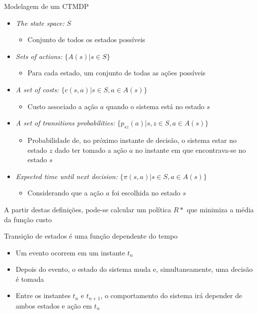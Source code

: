 \begin{frame}
  \begin{block}{Modelagem de um CTMDP}
    \begin{itemize}
      \pause
      \item \alert{\textit{The state space:}} $S$
      \begin{itemize}
        \item Conjunto de todos os estados possíveis
      \end{itemize}
      \pause
      \item \alert{\textit{Sets of actions:}} $\{ A(s) | s \in S\}$
      \begin{itemize}
        \item Para cada estado, um conjunto de todas as ações possíveis
      \end{itemize}
      \pause
      \item \alert{\textit{A set of costs:}} $\{c(s,a) | s \in S, a \in A(s) \}$
      \begin{itemize}
        \item Custo associado a ação $a$ quando o sistema está no
        estado $s$
      \end{itemize}
      \pause
      \item \alert{\textit{A set of transitions probabilities:}}
      $ \{ p_{sz}(a) | s,z \in S, a \in A(s) \}$
      \begin{itemize}
        \item Probabilidade de, no próximo instante de decisão, o sistema estar
        no estado $z$ dado ter tomado a ação $a$ no instante em que
        encontrava-se no estado $s$
      \end{itemize}
      \pause
      \item \alert{\textit{Expected time until next decision:}}
      $ \{ \pi (s,a) | s \in S, a \in A(s) \}$
      \begin{itemize}
        \item Considerando que a ação $a$ foi escolhida no estado $s$
      \end{itemize}
    \end{itemize}
  \end{block}
  \pause
  A partir destas definições, pode-se calcular um política $R*$ que minimiza a
  média da função custo
\end{frame}

\begin{frame}
  \begin{block}{Transição de estados é uma função dependente do tempo}
    \begin{itemize}
      \item Um evento ocorrem em um instante $t_n$
      \item Depois do evento, o estado do sistema muda e, simultaneamente, uma
      decisão é tomada
      \item Entre os instantes $t_n$ e $t_{n+1}$, o comportamento do sistema
      irá depender de ambos estados e ação em $t_n$
    \end{itemize}
  \end{block}
\end{frame}

